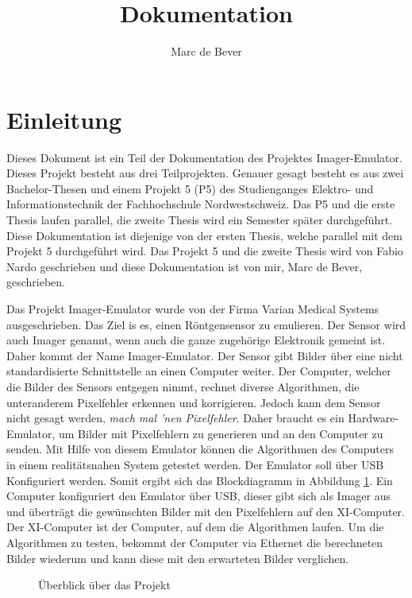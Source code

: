 \documentclass{article}
\title{Dokumentation}
\author{Marc de Bever}
\begin{document}
\maketitle
\tableofcontents

\section{Einleitung}
Dieses Dokument ist ein Teil der Dokumentation des Projektes Imager-Emu\-lator. Dieses Projekt besteht aus drei Teilprojekten. 
Genauer gesagt besteht es aus zwei Bachelor-Thesen und einem Projekt 5 (P5) des Studienganges Elektro- und Informationstechnik der Fachhochschule Nordwestschweiz. 
Das P5 und die erste Thesis laufen parallel, die zweite Thesis wird ein Semester später durchgeführt. Diese Dokumentation ist diejenige von der ersten Thesis, welche parallel mit dem Projekt 5 durchgeführt wird. Das Projekt 5 und die zweite Thesis wird von Fabio Nardo geschrieben und diese Dokumentation ist von mir, Marc de Bever, geschrieben. 

Das Projekt Imager-Emulator wurde von der Firma Varian Medical Systems ausgeschrieben. Das Ziel is es, einen Röntgensensor zu emulieren. Der Sensor wird auch Imager genannt, wenn auch die ganze zugehörige Elektronik gemeint ist. Daher kommt der Name Imager-Emulator. Der Sensor gibt Bilder über eine nicht standardisierte Schnittstelle an einen Computer weiter. Der Computer, welcher die Bilder des Sensors entgegen nimmt, rechnet diverse Algorithmen, die unteranderem Pixelfehler erkennen und korrigieren. Jedoch kann dem Sensor nicht gesagt werden, \textit{mach mal 'nen Pixelfehler}. Daher braucht es ein Hardware-Emulator, um Bilder mit Pixelfehlern zu generieren und an den Computer zu senden. Mit Hilfe von diesem Emulator können die Algorithmen des Computers in einem realitätsnahen System getestet werden. Der Emulator soll über USB Konfiguriert werden. Somit ergibt sich das Blockdiagramm in Abbildung \ref{fig:bd_sehr_grob}. Ein Computer konfiguriert den Emulator über USB, dieser gibt sich als Imager aus und überträgt die gewünschten Bilder mit den Pixelfehlern auf den XI-Computer. Der XI-Computer ist der Computer, auf dem die Algorithmen laufen. Um die Algorithmen zu testen, bekommt der Computer via Ethernet die berechneten Bilder wiederum  und kann diese mit den erwarteten Bilder verglichen.

\begin{figure}[tb]
    \caption{Überblick über das Projekt}
    \label{fig:bd_sehr_grob}
\end{figure}
\end{document}
